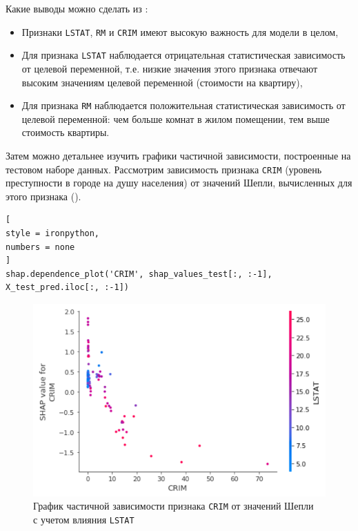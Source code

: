 \documentclass[%
	11pt,
	a4paper,
	utf8,
		]{article}
\begin{document}
Какие выводы можно сделать из :

\begin{itemize}
	\item Признаки \texttt{LSTAT}, \texttt{RM} и \texttt{CRIM} имеют высокую важность для модели в целом,
	
	\item Для признака \texttt{LSTAT} наблюдается отрицательная статистическая зависимость от целевой переменной, т.е. низкие значения этого признака отвечают высоким значениям целевой переменной (стоимости на квартиру),
	
	\item Для признака \texttt{RM} наблюдается положительная статистическая зависимость от целевой переменной: чем больше комнат в жилом помещении, тем выше стоимость квартиры.
\end{itemize}

Затем можно детальнее изучить графики частичной зависимости, построенные на тестовом наборе данных. Рассмотрим зависимость признака \texttt{CRIM} (уровень преступности в городе на душу населения) от значений Шепли, вычисленных для этого признака ().

\begin{lstlisting}[
style = ironpython,
numbers = none
]
shap.dependence_plot('CRIM', shap_values_test[:, :-1], X_test_pred.iloc[:, :-1])
\end{lstlisting}

\begin{figure}[h!]
	\centering
	\includegraphics[scale=0.85]{figures/dependeces_plt_test_CRIM.png}
	\caption{ График частичной зависимости признака \texttt{CRIM} от значений Шепли\\с учетом влияния \texttt{LSTAT} }\label{fig:dependeces_plt_test_CRIM}
\end{figure}
\end{document}
